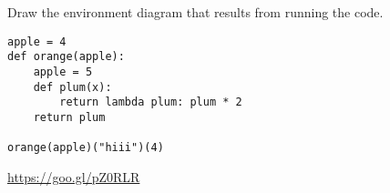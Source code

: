\begin{blocksection}
\question Draw the environment diagram that results from running the code.

\begin{lstlisting}
apple = 4
def orange(apple):
    apple = 5
    def plum(x):
        return lambda plum: plum * 2
    return plum

orange(apple)("hiii")(4)
\end{lstlisting}

\begin{solution}[2in]
\url{https://goo.gl/pZ0RLR}
\end{solution}
\end{blocksection}
